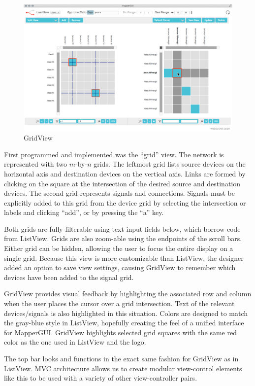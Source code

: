 \begin{figure}[ht]
\centering
	\includegraphics[width=\textwidth]{figures/grid_w_cursor}
\caption{GridView}
\label{fig:grid}
\end{figure}

First programmed and implemented was the ``grid'' view. The network is represented with two $m$-by-$n$ grids. The leftmost grid lists source devices on the horizontal axis and destination devices on the vertical axis. Links are formed by clicking on the square at the intersection of the desired source and destination devices. The second grid represents signals and connections. Signals must be explicitly added to this grid from the device grid by selecting the intersection or labels and clicking ``add'', or by pressing the ``a'' key. 

Both grids are fully filterable using text input fields below, which borrow code from ListView. Grids are also zoom-able using the endpoints of the scroll bars. Either grid can be hidden, allowing the user to focus the entire display on a single grid. Because this view is more customizable than ListView, the designer added an option to save view settings, causing GridView to remember which devices have been added to the signal grid.

GridView provides visual feedback by highlighting the associated row and column when the user places the cursor over a grid intersection. Text of the relevant devices/signals is also highlighted in this situation. Colors are designed to match the gray-blue style in ListView, hopefully creating the feel of a unified interface for MapperGUI. GridView highlights selected grid squares with the same red color as the one used in ListView and the logo.

The top bar looks and functions in the exact same fashion for GridView as in ListView. MVC architecture allows us to create modular view-control elements like this to be used with a variety of other view-controller pairs.

